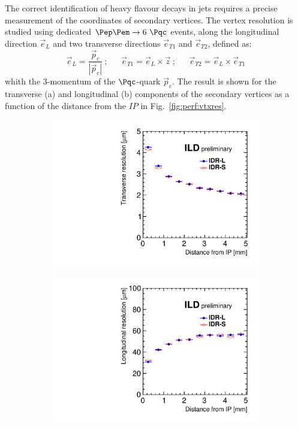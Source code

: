 The correct identification of heavy flavour decays in jets requires a precise measurement of the coordinates of secondary vertices.
The vertex resolution is studied using  dedicated $\Pep\Pem \rightarrow 6~\Pqc$ events, along the longitudinal direction $\vec{e}_L$
and two transverse directions $\vec{e}_{T1}$ and $\vec{e}_{T2}$, defined as:
\begin{equation}
\vec{e}_L = \frac{ \vec{p}_c }{|\vec{p}_c| }~; ~~~~~~~  \vec{e}_{T1} = \vec{e}_L \times \vec{z} ~; ~~~~~~~  \vec{e}_{T2} = \vec{e}_L \times \vec{e}_{T1}
\end{equation}
whith the 3-momentum of the $\Pqc$-quark $\vec{p}_c$.
The result is shown for the transverse (a) and longitudinal (b) components of the secondary vertices as a function of the distance from the $IP$
in Fig.~\ref{fig:perf:vtxres}.
\begin{figure}[htbp]
\begin{subfigure}{0.49\hsize}
 \includegraphics[width=\hsize]{Performance/fig/svtx_r_resol.pdf}
 \caption{ \label{fig:perf:svtx_r}}
 \end{subfigure}
\begin{subfigure}{0.49\hsize}
 \includegraphics[width=\hsize]{Performance/fig/svtx_z_resol.pdf}

\end{subfigure}
\end{figure}
